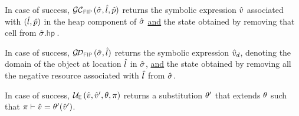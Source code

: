 \begin{description}
\setlength{\itemsep}{0.2em}
  \item[FIP GetCell.] In case of success, $\GetCellV{\sstate, \sloc, \sexprp}$ returns 
          the symbolic expression $\hat{v}$ associated with 
          $(\hat{l}, \hat{p})$ in the heap component of $\hat{\sigma}$ \underline{and} 
          the state obtained by removing that cell from $\sstate.\hpsel$.
  
  \item[FIP GetDomain.] In case of success, $\GetDomainV{\sstate, \sloc}$ returns 
          the symbolic expression $\hat{v}_d$, denoting the domain 
          of the object at location $\hat{l}$ in $\hat{\sigma}$, \underline{and} 
          the state obtained by removing all the negative resource associated with 
          $\hat{l}$ from $\hat{\sigma}$.  
  
  \item[Expression Unification.]  In case of success, $\unifylexpr(\sexprv, \sexprv', \subst, \pc)$ 
          returns a substitution $\theta'$ that extends $\theta$ such that $\pi \vdash \hat{v} = \theta'(\hat{v}')$. 
\end{description}

